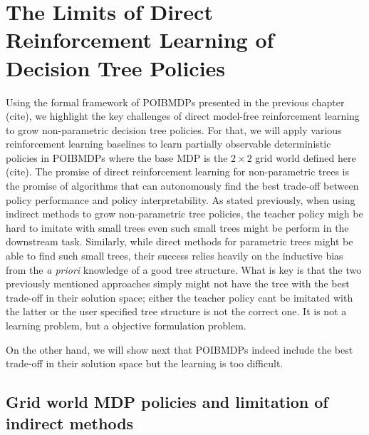 \chapter{The Limits of Direct Reinforcement Learning of Decision Tree Policies}
Using the formal framework of POIBMDPs presented in the previous chapter (cite), we highlight the key challenges of direct model-free reinforcement learning to grow non-parametric decision tree policies.
For that, we will apply various reinforcement learning baselines to learn partially observable deterministic policies in POIBMDPs where the base MDP is the $2\times2$ grid world defined here (cite).
The promise of direct reinforcement learning for non-parametric trees is the promise of algorithms that can autonomously find the best trade-off between policy performance and policy interpretability.
As stated previously, when using indirect methods to grow non-parametric tree policies, the teacher policy migh be hard to imitate with small trees even such small trees might be perform in the downstream task.
Similarly, while direct methods for parametric trees might be able to find such small trees, their success relies heavily on the inductive bias from the \textit{a priori} knowledge of a good tree structure.
What is key is that the two previously mentioned approaches simply might not have the tree with the best trade-off in their solution space; either the teacher policy cant be imitated with the latter or the user specified tree structure is not the correct one.
It is not a learning problem, but a objective formulation problem.

On the other hand, we will show next that POIBMDPs indeed include the best trade-off in their solution space but the learning is too difficult.
\section{Grid world MDP policies and limitation of indirect methods}

